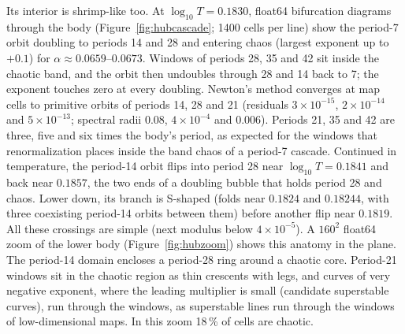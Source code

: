 \documentclass[11pt,letterpaper]{article}
\begin{document}
Its interior is shrimp-like too. At $\log_{10}T=0.1830$, float64 bifurcation diagrams through the body
(Figure~\ref{fig:hubcascade}; 1400 cells per line) show the period-7 orbit doubling to periods 14 and 28 and entering
chaos (largest exponent up to $+0.1$) for $\alpha\approx0.0659$--$0.0673$. Windows of periods 28, 35 and 42 sit
inside the chaotic band, and the orbit then undoubles through 28 and 14 back to 7; the exponent touches zero at every
doubling. Newton's method converges at map cells to primitive orbits of periods 14, 28 and 21 (residuals
$3\times10^{-15}$, $2\times10^{-14}$ and $5\times10^{-13}$; spectral radii $0.08$, $4\times10^{-4}$ and $0.006$).
Periods 21, 35 and 42 are three, five and six times the body's period, as expected for the windows that renormalization places inside the band chaos of a period-7 cascade. Continued in temperature, the period-14 orbit flips into period 28 near
$\log_{10}T=0.1841$ and back near $0.1857$, the two ends of a doubling bubble that holds period 28 and chaos. Lower
down, its branch is S-shaped (folds near $0.1824$ and $0.18244$, with three coexisting period-14 orbits between them)
before another flip near $0.1819$. All these crossings are simple (next modulus below $4\times10^{-5}$). A $160^2$
float64 zoom of the lower body (Figure~\ref{fig:hubzoom}) shows this anatomy in the plane. The period-14 domain
encloses a period-28 ring around a chaotic core. Period-21 windows sit in the chaotic region as thin crescents with
legs, and curves of very negative exponent, where the leading multiplier is small (candidate superstable curves),
run through the windows, as superstable lines run through the windows of low-dimensional maps. In this zoom
18\,\% of cells are chaotic.
\end{document}

